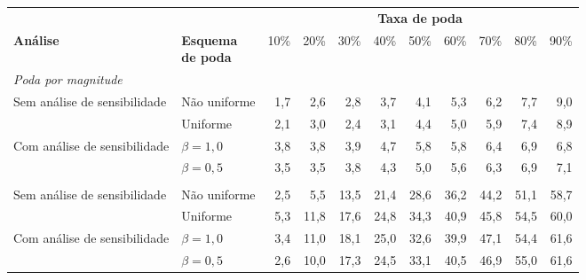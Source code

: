 \setlength{\tabcolsep}{5pt}
\begin{tabular}{p{2.8cm} l rrrrrrrrr}
\hline
& & \multicolumn{9}{c}{\textbf{Taxa de poda}} \\
\cline{3-11}
\textbf{Análise} & \makecell{\textbf{Esquema}\\ \textbf{de poda}} & 10\% & 20\% & 30\% & 40\% & 50\% & 60\% & 70\% & 80\% & 90\% \\
\hline
\multicolumn{11}{l}{\textit{Poda por magnitude}} \\
\multirow{2}{2.8cm}{Sem análise de sensibilidade} & Não uniforme & 1,7 & 2,6 & 2,8 & 3,7 & 4,1 & 5,3 & 6,2 & 7,7 & 9,0 \\
 & Uniforme & 2,1 & 3,0 & 2,4 & 3,1 & 4,4 & 5,0 & 5,9 & 7,4 & 8,9 \\
\multirow{2}{2.8cm}{Com análise de sensibilidade} & $\beta = 1{,}0$ & 3,8 & 3,8 & 3,9 & 4,7 & 5,8 & 5,8 & 6,4 & 6,9 & 6,8 \\
 & $\beta = 0{,}5$ & 3,5 & 3,5 & 3,8 & 4,3 & 5,0 & 5,6 & 6,3 & 6,9 & 7,1 \\
\addlinespace
\multicolumn{11}{l}{\textit{Poda estruturada}} \\
\multirow{2}{2.8cm}{Sem análise de sensibilidade} & Não uniforme & 2,5 & 5,5 & 13,5 & 21,4 & 28,6 & 36,2 & 44,2 & 51,1 & 58,7 \\
 & Uniforme & 5,3 & 11,8 & 17,6 & 24,8 & 34,3 & 40,9 & 45,8 & 54,5 & 60,0 \\
\multirow{2}{2.8cm}{Com análise de sensibilidade} & $\beta = 1{,}0$ & 3,4 & 11,0 & 18,1 & 25,0 & 32,6 & 39,9 & 47,1 & 54,4 & 61,6 \\
 & $\beta = 0{,}5$ & 2,6 & 10,0 & 17,3 & 24,5 & 33,1 & 40,5 & 46,9 & 55,0 & 61,6 \\
\hline
\end{tabular}
